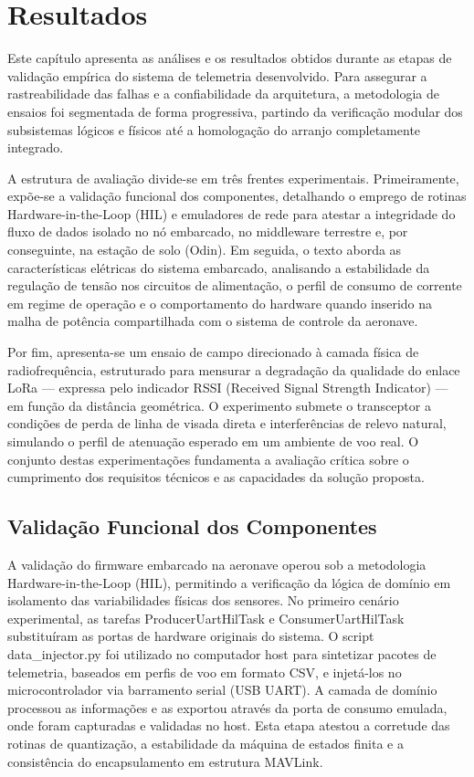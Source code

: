 \chapter{Resultados}
\label{chap:resultados}

Este capítulo apresenta as análises e os resultados obtidos durante as etapas de validação empírica do sistema de telemetria desenvolvido. Para assegurar a rastreabilidade das falhas e a confiabilidade da arquitetura, a metodologia de ensaios foi segmentada de forma progressiva, partindo da verificação modular dos subsistemas lógicos e físicos até a homologação do arranjo completamente integrado.

A estrutura de avaliação divide-se em três frentes experimentais. Primeiramente, expõe-se a validação funcional dos componentes, detalhando o emprego de rotinas Hardware-in-the-Loop (HIL) e emuladores de rede para atestar a integridade do fluxo de dados isolado no nó embarcado, no middleware terrestre e, por conseguinte, na estação de solo (Odin). Em seguida, o texto aborda as características elétricas do sistema embarcado, analisando a estabilidade da regulação de tensão nos circuitos de alimentação, o perfil de consumo de corrente em regime de operação e o comportamento do hardware quando inserido na malha de potência compartilhada com o sistema de controle da aeronave.

Por fim, apresenta-se um ensaio de campo direcionado à camada física de radiofrequência, estruturado para mensurar a degradação da qualidade do enlace LoRa — expressa pelo indicador RSSI (Received Signal Strength Indicator) — em função da distância geométrica. O experimento submete o transceptor a condições de perda de linha de visada direta e interferências de relevo natural, simulando o perfil de atenuação esperado em um ambiente de voo real. O conjunto destas experimentações fundamenta a avaliação crítica sobre o cumprimento dos requisitos técnicos e as capacidades da solução proposta.


\section{Validação Funcional dos Componentes}
A validação do firmware embarcado na aeronave operou sob a metodologia Hardware-in-the-Loop (HIL), permitindo a verificação da lógica de domínio em isolamento das variabilidades físicas dos sensores. No primeiro cenário experimental, as tarefas ProducerUartHilTask e ConsumerUartHilTask substituíram as portas de hardware originais do sistema. O script data\_injector.py foi utilizado no computador host para sintetizar pacotes de telemetria, baseados em perfis de voo em formato CSV, e injetá-los no microcontrolador via barramento serial (USB UART). A camada de domínio processou as informações e as exportou através da porta de consumo emulada, onde foram capturadas e validadas no host. Esta etapa atestou a corretude das rotinas de quantização, a estabilidade da máquina de estados finita e a consistência do encapsulamento em estrutura MAVLink.

